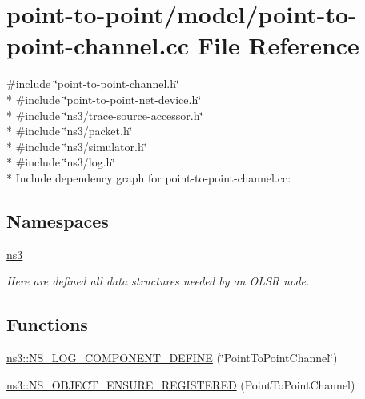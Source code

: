\hypertarget{point-to-point-channel_8cc}{}\section{point-\/to-\/point/model/point-\/to-\/point-\/channel.cc File Reference}
\label{point-to-point-channel_8cc}
{\ttfamily \#include \char`\"{}point-\/to-\/point-\/channel.\+h\char`\"{}}\\*
{\ttfamily \#include \char`\"{}point-\/to-\/point-\/net-\/device.\+h\char`\"{}}\\*
{\ttfamily \#include \char`\"{}ns3/trace-\/source-\/accessor.\+h\char`\"{}}\\*
{\ttfamily \#include \char`\"{}ns3/packet.\+h\char`\"{}}\\*
{\ttfamily \#include \char`\"{}ns3/simulator.\+h\char`\"{}}\\*
{\ttfamily \#include \char`\"{}ns3/log.\+h\char`\"{}}\\*
Include dependency graph for point-\/to-\/point-\/channel.cc\+:
\subsection*{Namespaces}
\begin{DoxyCompactItemize}
\item 
 \hyperlink{namespacens3}{ns3}
\begin{DoxyCompactList}\small\item\em Here are defined all data structures needed by an O\+L\+SR node. \end{DoxyCompactList}\end{DoxyCompactItemize}
\subsection*{Functions}
\begin{DoxyCompactItemize}
\item 
\hyperlink{namespacens3_a06fca9b8b2e7427e1947aa3b80e2abf6}{ns3\+::\+N\+S\+\_\+\+L\+O\+G\+\_\+\+C\+O\+M\+P\+O\+N\+E\+N\+T\+\_\+\+D\+E\+F\+I\+NE} (\char`\"{}Point\+To\+Point\+Channel\char`\"{})
\item 
\hyperlink{namespacens3_ad26ac7a9664fe7e6033e113eb979af43}{ns3\+::\+N\+S\+\_\+\+O\+B\+J\+E\+C\+T\+\_\+\+E\+N\+S\+U\+R\+E\+\_\+\+R\+E\+G\+I\+S\+T\+E\+R\+ED} (Point\+To\+Point\+Channel)
\end{DoxyCompactItemize}
